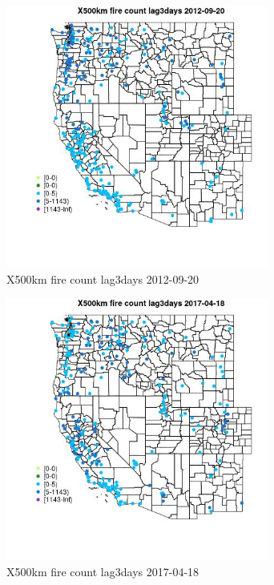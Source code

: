 \begin{figure} 
\centering  
\includegraphics[width=0.77\textwidth]{Code_Outputs/Report_ML_input_PM25_Step4_part_e_de_duplicated_aves_compiled_2019-05-14wNAs_MapObsX500km_fire_count_lag3days2012-09-20.jpg} 
\caption{\label{fig:Report_ML_input_PM25_Step4_part_e_de_duplicated_aves_compiled_2019-05-14wNAsMapObsX500km_fire_count_lag3days2012-09-20}X500km fire count lag3days 2012-09-20} 
\end{figure} 
 

\begin{figure} 
\centering  
\includegraphics[width=0.77\textwidth]{Code_Outputs/Report_ML_input_PM25_Step4_part_e_de_duplicated_aves_compiled_2019-05-14wNAs_MapObsX500km_fire_count_lag3days2017-04-18.jpg} 
\caption{\label{fig:Report_ML_input_PM25_Step4_part_e_de_duplicated_aves_compiled_2019-05-14wNAsMapObsX500km_fire_count_lag3days2017-04-18}X500km fire count lag3days 2017-04-18} 
\end{figure} 
 

